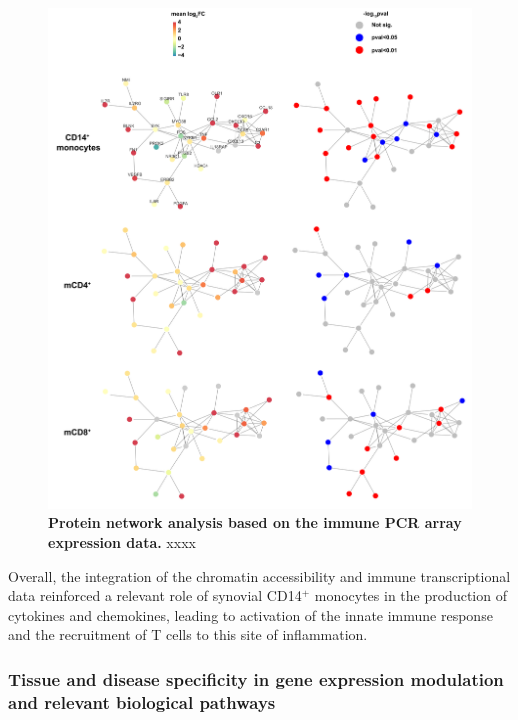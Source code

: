\begin{figure}[htbp]
\centering
\includegraphics[width=\textwidth]{./Results3/pdfs/PSA_PCR_array_network_analysis}
\caption[Protein network analysis based on the immune PCR array expression data.]{\textbf{Protein network analysis based on the immune PCR array expression data.} xxxx }
\label{fig:PSA_PCR_network_analysis}
\end{figure}

Overall, the integration of the chromatin accessibility and immune transcriptional data reinforced a relevant role of synovial CD14$^+$ monocytes in the production of cytokines and chemokines, leading to activation of the innate immune response and the recruitment of T cells to this site of inflammation. 




\subsubsection{Tissue and disease specificity in gene expression modulation and relevant biological pathways}

